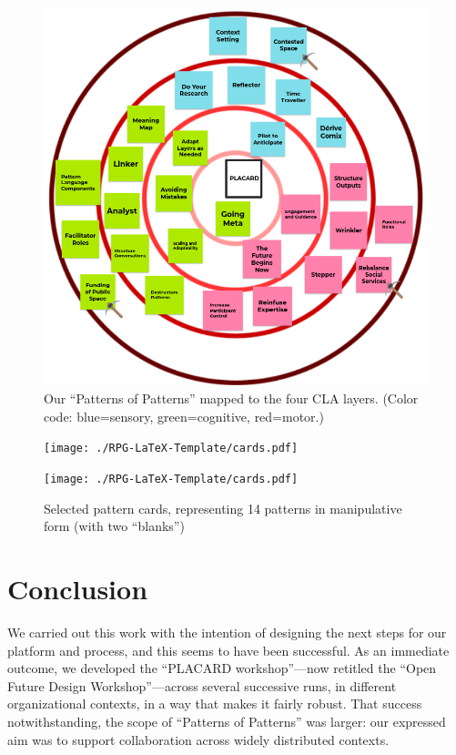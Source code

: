 \documentclass[acmlarge,timestamp]{acmart}
\begin{document}
\begin{figure}[p]
\includegraphics[trim={0 0 0 .1cm},clip=true, width=.9\textwidth]{revised-patterns-map.png}
\caption{Our “Patterns of Patterns” mapped to the four CLA layers. (Color code: blue=sensory, green=cognitive, red=motor.)\label{pattern-analysis}}
\end{figure}

\begin{figure}[h]
\begin{center}
\texttt{[image: ./RPG-LaTeX-Template/cards.pdf]}

\vspace{-.5cm}
  \noindent\texttt{[image: ./RPG-LaTeX-Template/cards.pdf]}
\end{center}
\vspace{-1cm}
\caption{Selected pattern cards, representing 14 patterns in manipulative form (with two “blanks”)\label{revised-cards}}
\end{figure}
\FloatBarrier

\section{Conclusion}

We carried out this work with the intention of designing the next
steps for our platform and process, and this seems to have been
successful.  As an immediate outcome, we developed the “PLACARD
workshop”—now retitled the “Open Future Design Workshop”—across
several successive runs, in different organizational contexts, in a
way that makes it fairly robust.  That success notwithstanding, the
scope of “Patterns of Patterns” was larger: our expressed aim was to
support collaboration across widely distributed contexts.
\end{document}
